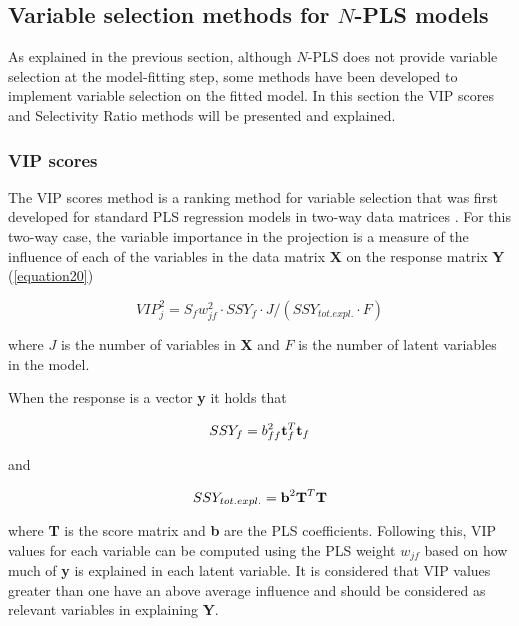 \subsection{Variable selection methods for $N$-PLS models}
As explained in the previous section, although $N$-PLS does not provide variable selection at the model-fitting step, some methods have been developed to implement variable selection on the fitted model. In this section the VIP scores and Selectivity Ratio methods will be presented and explained.

\subsubsection{VIP scores}
The VIP scores method is a ranking method for variable selection that was first developed for standard PLS regression models in two-way data matrices \parencite{wold2001pls, chong2005performance}. For this two-way case, the variable importance in the projection is a measure of the influence of each of the variables in the data matrix \textbf{X} on the response matrix \textbf{Y} (\autoref{equation20})

\begin{equation}
VIP^2_j=S_fw^2_{jf} \cdot SSY_f \cdot J/(SSY_{tot.expl.} \cdot F)
\label{equation20}
\end{equation}

where $J$ is the number of variables in \textbf{X} and $F$ is the number of latent variables in the model. 

When the response is a vector \textbf{y} it holds that

\begin{equation}
SSY_f=b^2_{ff}\textbf{\text{t}}_f^T\textbf{\text{t}}_f
\label{equation21}
\end{equation}

and

\begin{equation}
SSY_{tot.expl.}=\textbf{\text{b}}^2\textbf{\text{T}}^T\textbf{\text{T}}
\label{equation22}
\end{equation}

where \textbf{T} is the score matrix and \textbf{b} are the PLS coefficients. Following this, VIP values for each variable can be computed using the PLS weight $w_{jf}$ based on how much of \textbf{y} is explained in each latent variable. It is considered that VIP values greater than one have an above average influence and should be considered as relevant variables in explaining \textbf{Y}.

